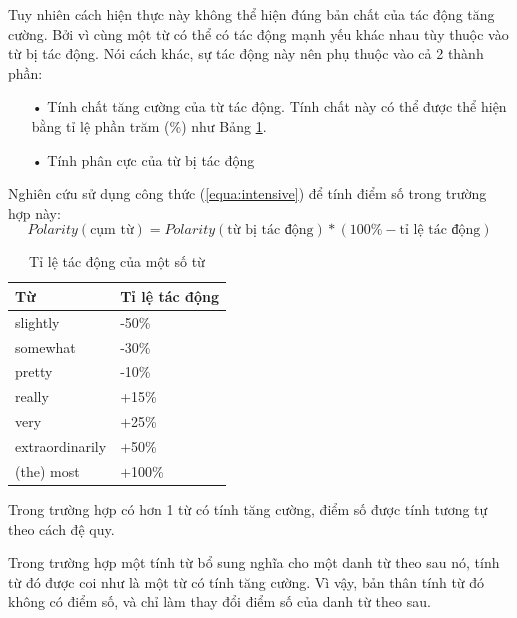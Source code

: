 Tuy nhiên cách hiện thực này không thể hiện đúng bản chất của tác động tăng cường. Bởi vì cùng một từ  có thể có tác động mạnh yếu khác nhau tùy thuộc vào từ bị tác động. Nói cách khác, sự tác động này nên phụ thuộc vào cả 2 thành phần: 
\begin{itemize}
\item[•] Tính chất tăng cường của từ tác động. Tính chất này có thể được thể hiện bằng tỉ lệ phần trăm (\%) như Bảng \ref{table:intensive}.
\item[•] Tính phân cực của từ bị tác động
\end{itemize}
Nghiên cứu \cite{taboada2011lexicon} sử dụng công thức (\ref{equa:intensive}) để tính điểm số trong trường hợp này:
\begin{equation}
\label{equa:intensive}
Polarity (\text{cụm từ}) = Polarity(\text{từ bị tác động}) * (100\% - \text{tỉ lệ tác động})
\end{equation}
\begin{table}[H]
\centering
\caption{Tỉ lệ tác động của một số từ} \label{table:intensive}
\begin{tabular}{l l}
\hline
\textbf{Từ} & \textbf{Tỉ lệ tác động} 
\\ \hline
slightly & -50\%
\\ 
somewhat & -30\%
\\ 
pretty & -10\%
\\ 
really & +15\%
\\ 
very & +25\%
\\ 
extraordinarily & +50\%
\\
(the) most & +100\%
\\ \hline
\end{tabular}
\end{table}
Trong trường hợp có hơn 1 từ có tính tăng cường, điểm số được tính tương tự theo cách đệ quy. \\

Trong trường hợp một tính từ bổ sung nghĩa cho một danh từ theo sau nó, tính từ đó được coi như là một từ có tính tăng cường. Vì vậy, bản thân tính từ đó không có điểm số, và chỉ làm thay đổi điểm số của danh từ theo sau. \\


